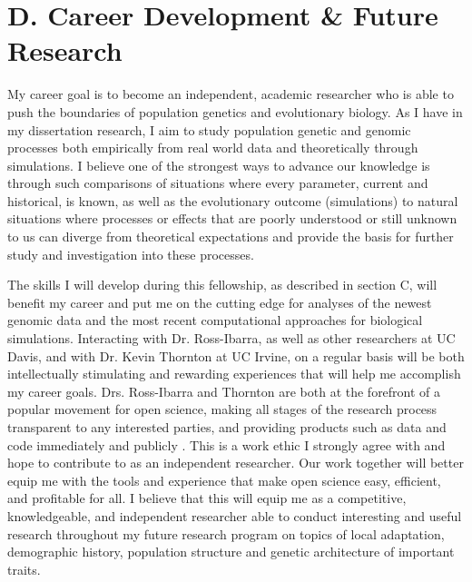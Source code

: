 \section*{D. Career Development \& Future Research}

My career goal is to become an independent, academic researcher who is able to push the boundaries of population genetics and evolutionary biology. As I have in my dissertation research, I aim to study population genetic and genomic processes both empirically from real world data and theoretically through simulations.  I believe one of the strongest ways to advance our knowledge is through such comparisons of situations where every parameter, current and historical, is known, as well as the evolutionary outcome (simulations) to natural situations where processes or effects that are poorly understood or still unknown to us can diverge from theoretical expectations and provide the basis for further study and investigation into these processes. 

The skills I will develop during this fellowship, as described in section C, will benefit my career and put me on the cutting edge for analyses of the newest genomic data and the most recent computational approaches for biological simulations. Interacting with Dr. Ross\--Ibarra, as well as other researchers at UC Davis, and with Dr. Kevin Thornton at UC Irvine, on a regular basis will be both intellectually stimulating and rewarding experiences that will help me accomplish my career goals. Drs. Ross\--Ibarra and Thornton are both at the forefront of a popular  movement for open science, making all stages of the research process transparent to any interested parties, and providing products such as data and code immediately and publicly  . This is a work ethic I strongly agree with and hope to contribute to as an independent researcher. Our work together will better equip me with the tools and experience that make open science easy, efficient, and profitable for all. I believe that this will equip me as a competitive, knowledgeable, and independent researcher able to conduct interesting and useful research throughout my future research program on topics of local adaptation, demographic history, population structure and genetic architecture of important traits.

